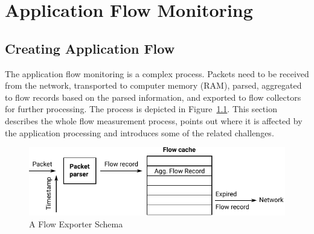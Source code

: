 \chapter{Application Flow Monitoring}



\section{Creating Application Flow}



The application flow monitoring is a complex process. Packets need to be received from the network, transported to computer memory (RAM), parsed, aggregated to flow records based on the parsed information, and exported to flow collectors for further processing. The process is depicted in Figure~\ref{fig:flow-exporter-schema}. This section describes the whole flow measurement process, points out where it is affected by the application processing and introduces some of the related challenges.

\begin{figure}[t!]
  \begin{center}
    \includegraphics[width=\textwidth]{figures/flow-exporter-schema}
  \end{center}
  \caption{A Flow Exporter Schema}
  \label{fig:flow-exporter-schema}
\end{figure}

